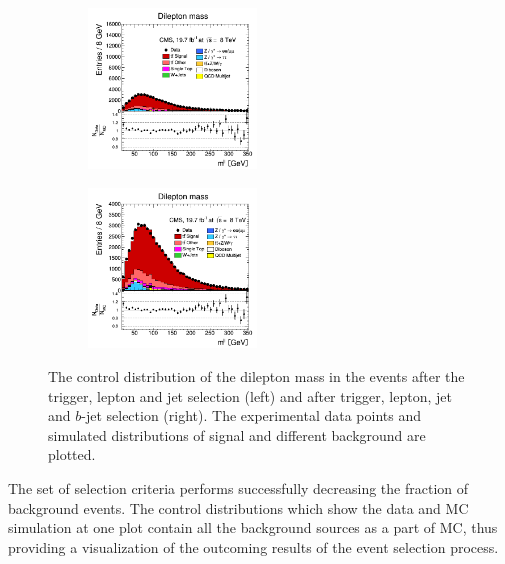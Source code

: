 \begin{itemize}
 \begin{figure}[h]
 \centering
 \begin{subfigure}
   \centering
   \includegraphics[width=0.49\textwidth]{04_event_reconstruction/plots/mll_step5.png}
 \end{subfigure}
 \begin{subfigure}
   \centering
   \includegraphics[width=0.49\textwidth]{04_event_reconstruction/plots/mll_step6.png}
 \end{subfigure}
 \caption{The control distribution of the dilepton mass in the events after the trigger, lepton and jet selection (left) and after trigger, lepton, jet and $b$-jet selection (right). 
 The experimental data points and simulated distributions of signal and different background are plotted.}
 \label{fig:mllbJetSel}
 \end{figure}
 \end{itemize}

The set of selection criteria performs successfully decreasing the fraction of background events. The control distributions which show the data and MC simulation at one plot
contain all the background sources as a part of MC, thus providing a visualization of the outcoming results of the event selection process. 